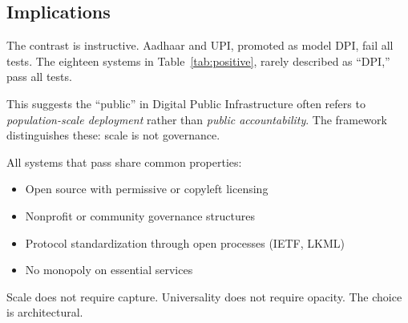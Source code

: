 \subsection{Implications}

The contrast is instructive. Aadhaar and UPI, promoted as model DPI, fail all tests. The eighteen systems in Table~\ref{tab:positive}, rarely described as ``DPI,'' pass all tests.

This suggests the ``public'' in Digital Public Infrastructure often refers to \textit{population-scale deployment} rather than \textit{public accountability}. The framework distinguishes these: scale is not governance.

All systems that pass share common properties:
\begin{itemize}
    \item Open source with permissive or copyleft licensing
    \item Nonprofit or community governance structures
    \item Protocol standardization through open processes (IETF, LKML)
    \item No monopoly on essential services
\end{itemize}

Scale does not require capture. Universality does not require opacity. The choice is architectural.